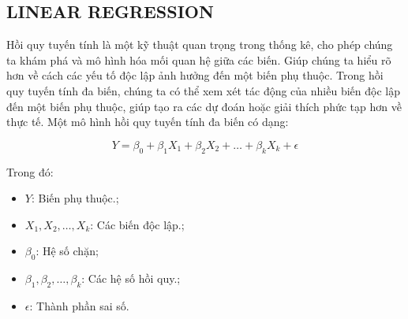 \subsection{LINEAR REGRESSION}
Hồi quy tuyến tính là một kỹ thuật quan trọng trong thống kê, cho phép chúng ta khám phá và mô hình hóa mối quan hệ giữa các biến. Giúp chúng ta hiểu rõ hơn về cách các yếu tố độc lập ảnh hưởng đến một biến phụ thuộc. Trong hồi quy tuyến tính đa biến, chúng ta có thể xem xét tác động của nhiều biến độc lập đến một biến phụ thuộc, giúp tạo ra các dự đoán hoặc giải thích phức tạp hơn về thực tế. Một mô hình hồi quy tuyến tính đa biến có dạng:

\[ Y = \beta_0 + \beta_1 X_1 + \beta_2 X_2 + \ldots + \beta_k X_k + \epsilon \]

Trong đó:
\begin{itemize}
  \item \( Y \): Biến phụ thuộc.;
  \item \( X_1, X_2, \ldots , X_k \): Các biến độc lập.;
  \item \( \beta_0 \): Hệ số chặn;
  \item \( \beta_1, \beta_2, \ldots, \beta_k \): Các hệ số hồi quy.;
  \item \( \epsilon \): Thành phần sai số.
\end{itemize}